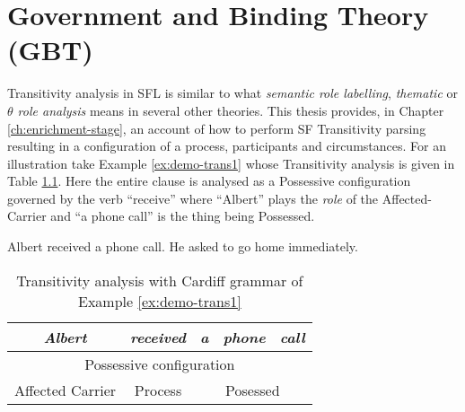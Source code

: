 \chapter{Government and Binding Theory (GBT)}
\label{ch:gbt}



    Transitivity analysis in SFL is similar to what \textit{semantic role labelling}, \textit{thematic} or \textit{$\theta$ role analysis} means in several other theories. This thesis provides, in Chapter \ref{ch:enrichment-stage}, an account of how to perform SF Transitivity parsing resulting in a configuration of a process, participants and circumstances. For an illustration take Example \ref{ex:demo-trans1} whose Transitivity analysis is given in Table \ref{tab:demo-trans1}. Here the entire clause is analysed as a Possessive configuration governed by the verb ``receive'' where ``Albert'' plays the \textit{role} of the Affected-Carrier and ``a phone call'' is the thing being Possessed.

    \begin{exe}
        \ex\label{ex:demo-trans1} Albert received a phone call.
        \ex\label{ex:demo-trans2} He asked to go home immediately.
    \end{exe}

    \begin{table}[!ht]
        \centering
        \begin{tabular}{|c|c|c|c|c|}
            \hline
            \textit{Albert}  & \textit{received} & \textit{a} & \textit{phone} & \textit{call} \\ \hline
            \multicolumn{5}{|c|}{Possessive configuration}                                     \\ \hline
            Affected Carrier & Process           & \multicolumn{3}{c|}{Posessed}               \\ \hline
        \end{tabular}
        \caption{Transitivity analysis with Cardiff grammar of Example \ref{ex:demo-trans1}}
        \label{tab:demo-trans1}
    \end{table}

